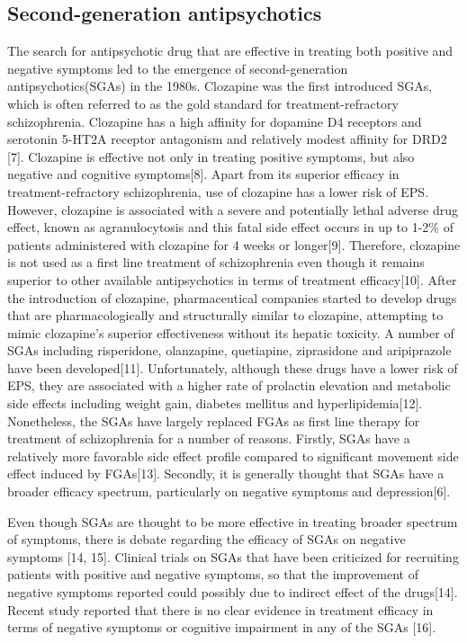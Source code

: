 \documentclass[12pt]{report}
\begin{document}
		\subsection{Second-generation antipsychotics}
			The search for antipsychotic drug that are effective in treating both positive and negative symptoms led to the emergence of second-generation antipsychotics(SGAs) in the 1980s. 
			Clozapine was the first introduced SGAs, which is often referred to as the gold standard for treatment-refractory schizophrenia. 
			Clozapine has a high affinity for dopamine D4 receptors and serotonin 5-HT2A receptor antagonism and relatively modest affinity for DRD2 [7]. 
			Clozapine is effective not only in treating positive symptoms, but also negative and cognitive symptoms[8]. 
			Apart from its superior efficacy in treatment-refractory schizophrenia, use of clozapine has a lower risk of EPS. 
			However, clozapine is associated with a severe and potentially lethal adverse drug effect, known as agranulocytosis and this fatal side effect occurs in up to 1-2$\%$ of patients administered with clozapine for 4 weeks or longer[9]. 
			Therefore, clozapine is not used as a first line treatment of schizophrenia even though it remains superior to other available antipsychotics in terms of treatment efficacy[10]. 
			After the introduction of clozapine, pharmaceutical companies started to develop drugs that are pharmacologically and structurally similar to clozapine, attempting to mimic clozapine’s superior effectiveness without its hepatic toxicity. 
			A number of SGAs including risperidone, olanzapine, quetiapine, ziprasidone and aripiprazole have been developed[11]. 
			Unfortunately, although these drugs have a lower risk of EPS, they are associated with a higher rate of prolactin elevation and metabolic side effects including weight gain, diabetes mellitus and hyperlipidemia[12]. 
			Nonetheless, the SGAs have largely replaced FGAs as first line therapy for treatment of schizophrenia for a number of reasons. 
			Firstly, SGAs have a relatively more favorable side effect profile compared to significant movement side effect induced by FGAs[13]. 
			Secondly, it is generally thought that SGAs have a broader efficacy spectrum, particularly on negative symptoms and depression[6].
			
			Even though SGAs are thought to be more effective in treating broader spectrum of symptoms, there is debate regarding the efficacy of SGAs on negative symptoms [14, 15]. 
			Clinical trials on SGAs that have been criticized for recruiting patients with positive and negative symptoms, so that the improvement of negative symptoms reported could possibly due to indirect effect of the drugs[14].  
			Recent study reported that there is no clear evidence in treatment efficacy in terms of negative symptoms or cognitive impairment in any of the SGAs [16]. 
		
\end{document}
